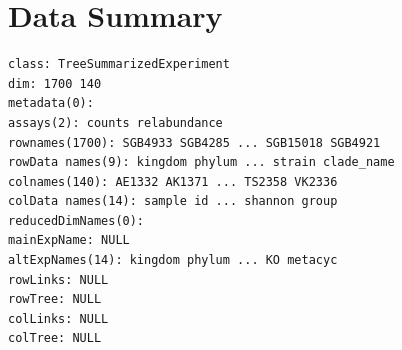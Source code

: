 \documentclass[
]{article}
\begin{document}
\section{Data Summary}\label{data-summary}

\begin{verbatim}
class: TreeSummarizedExperiment 
dim: 1700 140 
metadata(0):
assays(2): counts relabundance
rownames(1700): SGB4933 SGB4285 ... SGB15018 SGB4921
rowData names(9): kingdom phylum ... strain clade_name
colnames(140): AE1332 AK1371 ... TS2358 VK2336
colData names(14): sample id ... shannon group
reducedDimNames(0):
mainExpName: NULL
altExpNames(14): kingdom phylum ... KO metacyc
rowLinks: NULL
rowTree: NULL
colLinks: NULL
colTree: NULL
\end{verbatim}
\end{document}
